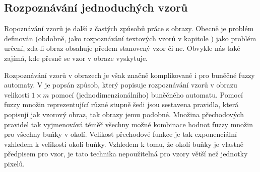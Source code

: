 \documentclass[a4paper,10pt]{article}
\begin{document}
\subsection{Rozpoznávání jednoduchých vzorů}

Ropoznávání vzorů je další z častých způsobů práce s obrazy. Obecně je problém definován (obdobně, jako rozpoznávání textových vzorů v kapitole ) jako problém určení, zda-li obraz obsahuje předem stanovený vzor či ne. Obvykle nás také zajímá, kde přesně se vzor v obraze vyskytuje.

Rozpoznávání vzorů v obrazech je však značně komplikované i pro buněčné fuzzy automaty. V \cite{MajCha-FuzCelAutModPatClas} je popsán způsob, který popisuje rozpoznávání vzorů v obrazu velikosti $1 \times m$ pomocí (jednodimenzionálního) buněčného automatu. Pomocí fuzzy množin reprezentující různé stupně šedi jsou sestavena pravidla, která popisují jak vzorový obraz, tak obrazy jemu podobné. Množina přechodových pravidel tak vyjmenovává téměř všechny možné kombinace hodnot fuzzy množin pro všechny buňky v okolí. Velikost přechodové funkce je tak exponenciální vzhledem k velikosti okolí buňky. Vzhledem k tomu, že okolí buňky je vlastně předpisem pro vzor, je tato technika nepoužitelná pro vzory větší než jednotky pixelů.
\end{document}
